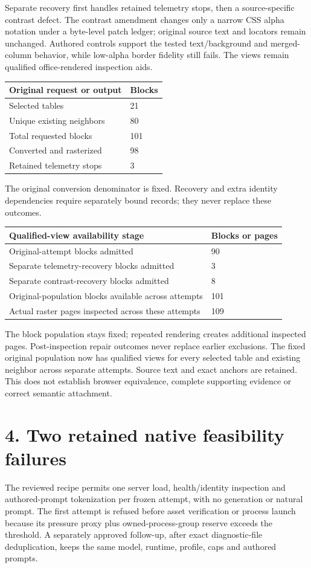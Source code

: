 \documentclass[10pt,a4paper]{article}
\begin{document}
Separate recovery first handles retained telemetry stops, then a source-specific contrast defect. The contrast amendment changes only a narrow CSS alpha notation under a byte-level patch ledger; original source text and locators remain unchanged. Authored controls support the tested text/background and merged-column behavior, while low-alpha border fidelity still fails. The views remain qualified office-rendered inspection aids.

\begin{longtable}{@{}p{}p{}@{}}\toprule
\textbf{Original request or output} & \textbf{Blocks} \\ \midrule\endhead
Selected tables & 21 \\
Unique existing neighbors & 80 \\
Total requested blocks & 101 \\
Converted and rasterized & 98 \\
Retained telemetry stops & 3 \\
\bottomrule\end{longtable}
{\small The original conversion denominator is fixed. Recovery and extra identity dependencies require separately bound records; they never replace these outcomes.}
\begin{longtable}{@{}p{}p{}@{}}\toprule
\textbf{Qualified-view availability stage} & \textbf{Blocks or pages} \\ \midrule\endhead
Original-attempt blocks admitted & 90 \\
Separate telemetry-recovery blocks admitted & 3 \\
Separate contrast-recovery blocks admitted & 8 \\
Original-population blocks available across attempts & 101 \\
Actual raster pages inspected across these attempts & 109 \\
\bottomrule\end{longtable}
{\small The block population stays fixed; repeated rendering creates additional inspected pages. Post-inspection repair outcomes never replace earlier exclusions.}
The fixed original population now has qualified views for every selected table and existing neighbor across separate attempts. Source text and exact anchors are retained. This does not establish browser equivalence, complete supporting evidence or correct semantic attachment.

\clearpage
\section*{4. Two retained native feasibility failures}
The reviewed recipe permits one server load, health/identity inspection and authored-prompt tokenization per frozen attempt, with no generation or natural prompt. The first attempt is refused before asset verification or process launch because its pressure proxy plus owned-process-group reserve exceeds the threshold. A separately approved follow-up, after exact diagnostic-file deduplication, keeps the same model, runtime, profile, caps and authored prompts.
\end{document}
